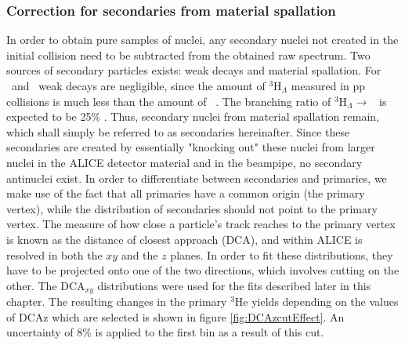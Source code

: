 

\subsubsection{Correction for secondaries from material spallation}\label{sec:Meth:secondaryCorr}
In order to obtain pure samples of nuclei, any secondary nuclei not created in the initial collision need to be subtracted from the obtained raw spectrum. Two sources of secondary particles exists: weak decays and material spallation. For \ahe\ and \atrit\, weak decays are negligible, since the amount of $^3\mathrm{H}_\Lambda$ measured in pp collisions is much less than the amount of \ahe\ . The branching ratio of $^3\mathrm{H}_\Lambda \rightarrow $ \ahe\ is expected to be 25\% \cite{PDG2022}. Thus, secondary nuclei from material spallation remain, which shall simply be referred to as secondaries hereinafter. Since these secondaries are created by essentially "knocking out" these nuclei from larger nuclei in the ALICE detector material and in the beampipe, no secondary antinuclei exist. In order to differentiate between secondaries and primaries, we make use of the fact that all primaries have a common origin (the primary vertex), while the distribution of secondaries should not point to the primary vertex. The measure of how close a particle's track reaches to the primary vertex is known as the distance of closest approach (DCA), and within ALICE is resolved in both the $xy$ and the $z$ planes. In order to fit these distributions, they have to be projected onto one of the two directions, which involves cutting on the other. The DCA$_{xy}$ distributions were used for the fits described later in this chapter. The resulting changes in the primary $^3\mathrm{He}$ yields depending on the values of DCAz which are selected is shown in figure \ref{fig:DCAzcutEffect}. An uncertainty of 8\% is applied to the first bin as a result of this cut.

